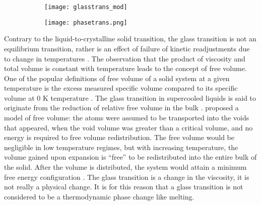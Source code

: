 \begin{figure}[!h] \centering
	\begin{subfigure}{0.4\textwidth} \vfill
		\texttt{[image: glasstrans\_mod]}
		\subcaption{}
	\end{subfigure}%
	\begin{subfigure}{0.6\textwidth}
		\texttt{[image: phasetrans.png]}
		\subcaption{}
	\end{subfigure}
	\label{f:rq-mg-sch}
\end{figure}

Contrary to the liquid-to-crystalline solid transition, the glass transition is not an equilibrium transition, rather is an effect of failure of kinetic readjustments due to change in temperatures \cite{Fox1950,Ramachandrarao1977,Ediger1996}. The observation that the product of viscosity and total volume is constant with temperature \cite{Batschinski1913} leads to the concept of free volume. One of the popular definitions of free volume of a solid system at a given temperature is the excess measured specific volume compared to its specific volume at 0 K temperature \cite{Ramachandrarao1977}. The glass transition in supercooled liquids is said to originate from the reduction of relative free volume in the bulk \cite{Fox1951}. \textcite{Cohen1959} proposed a model of free volume: the atoms were assumed to be transported into the voids that appeared, when the void volume was greater than a critical volume, and no energy is required to free volume redistribution. The free volume would be negligible in low temperature regimes, but with increasing temperature, the volume gained upon expansion is ``free'' to be redistributed into the entire bulk of the solid. After the volume is distributed, the system would attain a minimum free energy configuration \cite{Turnbull1961}. The glass transition is a change in the viscosity, it is not really a physical change. It is for this reason that a glass transition is not considered to be a thermodynamic phase change like melting. \par

